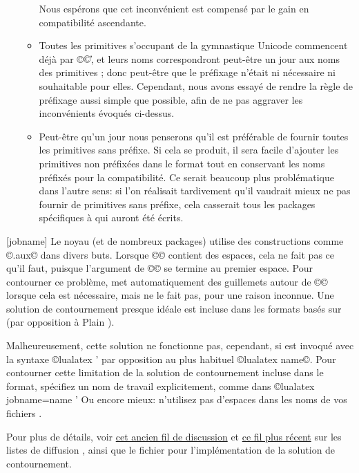 \documentclass{lltxdoc}
\begin{document}
\begin{myquote}
\begin{enumerate}
\begin{itemize}
          Nous espérons que cet inconvénient est compensé par le gain en
          compatibilité ascendante.
        \item Toutes les primitives s'occupant de la gymnastique Unicode
          commencent déjà par ©\U©, et leurs noms correspondront peut-être
          un jour aux noms des primitives \xetex; donc peut-être que le
          préfixage n'était ni nécessaire ni souhaitable pour elles.
          Cependant, nous avons essayé de rendre la règle de préfixage aussi
          simple que possible, afin de ne pas aggraver les inconvénients
          évoqués ci-dessus.
        \item Peut-être qu'un jour nous penserons qu'il est préférable de fournir
          toutes les primitives sans préfixe. Si cela se produit, il sera facile
          d'ajouter les primitives non préfixées dans le format tout en conservant
          les noms préfixés pour la compatibilité. Ce serait beaucoup plus
          problématique dans l'autre sens: si l'on réalisait tardivement qu'il
          vaudrait mieux ne pas fournir de primitives sans préfixe, cela casserait
          tous les packages spécifiques à \luatex qui auront été écrits.
      \end{itemize}
  \end{enumerate}
\end{myquote}

[jobname]
Le noyau \latex (et de nombreux packages) utilise des constructions comme
©\jobname.aux© dans divers buts. Lorsque ©\jobname© contient des espaces,
cela ne fait pas ce qu'il faut, puisque l'argument de ©© se termine au
premier espace. Pour contourner ce problème, \pdftex met automatiquement des
guillemets autour de ©\jobname© lorsque cela est nécessaire, mais \luatex ne le fait pas,
pour une raison inconnue. Une solution de contournement presque idéale
est incluse dans les formats \luatex basés sur \latex (par opposition à Plain \tex).

Malheureusement, cette solution ne fonctionne pas, cependant, si \luatex est invoqué avec la syntaxe
©lualatex ' par opposition au plus habituel ©lualatex name©.
Pour contourner cette limitation de la solution de contournement incluse dans le format,
spécifiez un nom de travail explicitement, comme dans
©lualatex jobname=name ' Ou encore mieux: n'utilisez pas d'espaces
dans les noms de vos fichiers \tex.

Pour plus de détails, voir \href{http://www.ntg.nl/pipermail/dev-luatex/2009-April/002549.html}{cet
ancien fil de discussion} et \href{http://tug.org/pipermail/luatex/2010-August/001986.html}{ce fil
plus récent} sur les listes de diffusion \luatex, ainsi que le fichier 
pour l'implémentation de la solution de contournement.
\end{document}
